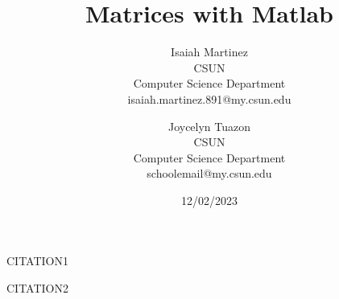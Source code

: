 \documentclass[a4paper,10pt]{article}
\begin{document}
%
   \title{Matrices with Matlab}

   \author{
   Isaiah Martinez \\ CSUN \\ Computer Science Department \\ isaiah.martinez.891@my.csun.edu
   \and
   Joycelyn Tuazon \\ CSUN \\ Computer Science Department \\ schoolemail@my.csun.edu}
          
   \date{12/02/2023}

   \maketitle
   
   \tableofcontents
 



  \newpage

  
  
  \newpage

  

  \newpage

  

  \newpage

  

  \newpage

  


  \begin{thebibliography}{}

     CITATION1
  
      CITATION2
  
  \end{thebibliography}
\end{document}
